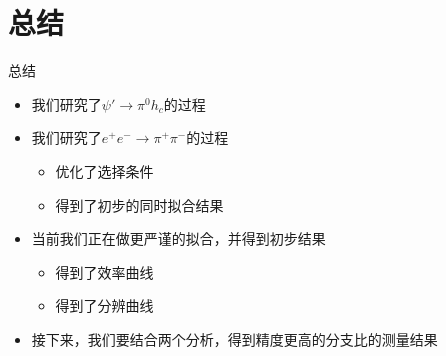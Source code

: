 \documentclass{beamer}
\begin{document}
\section{总结}
\begin{frame}{总结}
\begin{itemize}
\item 我们研究了$\psi\prime\to\pi^0 h_c$的过程\\
\item 我们研究了$e^+e^-\to\pi^+\pi^-$的过程
\begin{itemize}
\item 优化了选择条件
\item 得到了初步的同时拟合结果
\end{itemize}
\item 当前我们正在做更严谨的拟合，并得到初步结果
\begin{itemize}
\item 得到了效率曲线
\item 得到了分辨曲线
\end{itemize}
\item 接下来，我们要结合两个分析，得到精度更高的分支比的测量结果
\end{itemize}
\end{frame}
\end{document}
